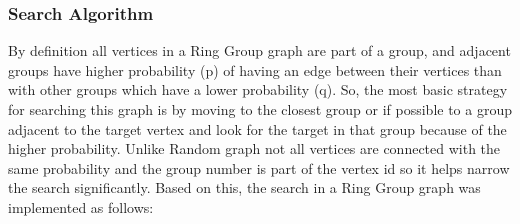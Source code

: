 \documentclass[11pt,a4paper,notitlepage]{article}
\begin{document}
\subsubsection*{Search Algorithm}
By definition all vertices in a Ring Group graph are part of a group, and adjacent groups have higher probability (p) of having an edge between their vertices than with other groups which have a lower probability (q). So, the most basic strategy for searching this graph is by moving to the closest group or if possible to a group adjacent to the target vertex and look for the target in that group because of the higher probability. Unlike Random graph not all vertices are connected with the same probability and the group number is part of the vertex id so it helps narrow the search significantly. Based on this, the search in a Ring Group graph was implemented as follows:
\end{document}
